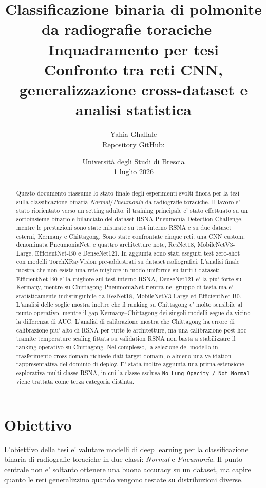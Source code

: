 \documentclass[11pt,a4paper]{article}
\title{\textbf{Classificazione binaria di polmonite da radiografie toraciche -- Inquadramento per tesi}\\
\large Confronto tra reti CNN, generalizzazione cross-dataset e analisi statistica}
\author{Yahia Ghallale\\
\small Repository GitHub: \githuburl}
\date{Università degli Studi di Brescia \\ 1 luglio 2026}
\newcommand{\normal}{\textit{Normal}}
\newcommand{\pneumonia}{\textit{Pneumonia}}
\begin{document}
\maketitle

\begin{abstract}
Questo documento riassume lo stato finale degli esperimenti svolti finora per
la tesi sulla classificazione binaria \normal/\pneumonia{} da radiografie
toraciche. Il lavoro e' stato riorientato verso un setting adulto: il training
principale e' stato effettuato su un sottoinsieme binario e bilanciato del
dataset RSNA Pneumonia Detection Challenge, mentre le prestazioni sono state
misurate su test interno RSNA e su due dataset esterni, Kermany e Chittagong.
Sono state confrontate cinque reti: una CNN custom, denominata PneumoniaNet, e
quattro architetture note, ResNet18, MobileNetV3-Large, EfficientNet-B0 e
DenseNet121. In aggiunta sono stati eseguiti test zero-shot con modelli
TorchXRayVision pre-addestrati su dataset radiografici. L'analisi finale mostra
che non esiste una rete migliore in modo uniforme su tutti i dataset:
EfficientNet-B0 e' la migliore sul test interno RSNA, DenseNet121 e' la piu'
forte su Kermany, mentre su Chittagong PneumoniaNet rientra nel gruppo di testa
ma e' statisticamente indistinguibile da ResNet18, MobileNetV3-Large ed
EfficientNet-B0. L'analisi delle soglie mostra inoltre che il ranking su
Chittagong e' molto sensibile al punto operativo, mentre il gap
Kermany--Chittagong dei singoli modelli segue da vicino la differenza di AUC.
L'analisi di calibrazione mostra che Chittagong ha errore di calibrazione piu'
alto di RSNA per tutte le architetture, ma una calibrazione post-hoc tramite
temperature scaling fittata su validation RSNA non basta a stabilizzare il
ranking operativo su Chittagong. Nel complesso, la selezione del modello in
trasferimento cross-domain richiede dati target-domain, o almeno una validation
rappresentativa del dominio di deploy. E' stata inoltre aggiunta una prima
estensione esplorativa multi-classe RSNA, in cui la classe esclusa
\texttt{No Lung Opacity / Not Normal} viene trattata come terza categoria
distinta.
\end{abstract}

\tableofcontents
\newpage

\section{Obiettivo}

L'obiettivo della tesi e' valutare modelli di deep learning per la
classificazione binaria di radiografie toraciche in due classi:
\normal{} e \pneumonia. Il punto centrale non e' soltanto ottenere una buona
accuracy su un dataset, ma capire quanto le reti generalizzino quando vengono
testate su distribuzioni diverse.
\end{document}
